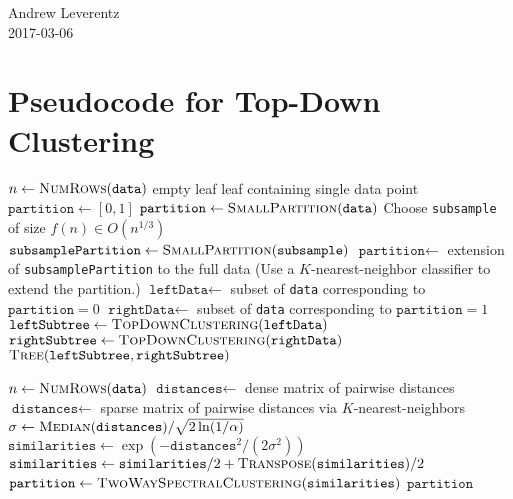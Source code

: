 \documentclass[11pt]{article}
\begin{document}
\begin{flushright}
Andrew Leverentz \\
2017-03-06
\end{flushright}

\section*{Pseudocode for Top-Down Clustering}

\begin{algorithmic}
  \State $n \gets \textsc{NumRows}(\texttt{data})$
    \State \Return empty leaf
    \State \Return leaf containing single data point
    \State $\texttt{partition} \gets [0, 1]$
    \State $\texttt{partition} \gets \textsc{SmallPartition}(\texttt{data})$
  \Else
    \State Choose \texttt{subsample} of size $f(n) \in O(n^{1/3})$
    \State $\texttt{subsamplePartition} \gets \textsc{SmallPartition}(\texttt{subsample})$
    \State $\texttt{partition} \gets$ extension of \texttt{subsamplePartition} to the full data
    \State (Use a $K$-nearest-neighbor classifier to extend the partition.)
  \EndIf
  \State $\texttt{leftData} \gets $ subset of \texttt{data} corresponding to $\texttt{partition} = 0$
  \State $\texttt{rightData} \gets $ subset of \texttt{data} corresponding to $\texttt{partition} = 1$
  \State $\texttt{leftSubtree} \gets \textsc{TopDownClustering}(\texttt{leftData})$
  \State $\texttt{rightSubtree} \gets \textsc{TopDownClustering}(\texttt{rightData})$
  \State \Return $\textsc{Tree}(\texttt{leftSubtree}, \texttt{rightSubtree})$
\EndFunction
\end{algorithmic}

\begin{algorithmic}
  \State $n \gets \textsc{NumRows}(\texttt{data})$
    \State $\texttt{distances} \gets$ dense matrix of pairwise distances
  \Else
    \State $\texttt{distances} \gets$ sparse matrix of pairwise distances via $K$-nearest-neighbors
  \EndIf
  \State $\sigma \gets \textsc{Median}(\texttt{distances}) / {\sqrt{2 \ln (1/\alpha)}}$
  \State $\texttt{similarities} \gets \exp(-\texttt{distances}^2 / (2 \sigma^2))$
  \State $\texttt{similarities} \gets \texttt{similarities} / 2 + \textsc{Transpose}(\texttt{similarities}) / 2$
  \State $\texttt{partition} \gets \textsc{TwoWaySpectralClustering}(\texttt{similarities})$
  \State \Return $\texttt{partition}$
\EndFunction
\end{algorithmic}
\end{document}
